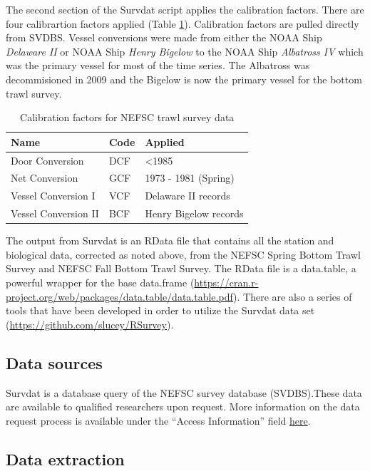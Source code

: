 \documentclass[
]{book}
\begin{document}
The second section of the Survdat script applies the calibration factors. There are four calibrartion
factors applied (Table \ref{tab:calibration}). Calibration factors are pulled directly from SVDBS. Vessel conversions were made from
either the NOAA Ship \emph{Delaware II} or NOAA Ship \emph{Henry Bigelow} to the NOAA Ship \emph{Albatross IV} which was
the primary vessel for most of the time series. The Albatross was decommisioned in 2009 and the Bigelow is
now the primary vessel for the bottom trawl survey.

\begin{table}

\caption{\label{tab:calibration}Calibration factors for NEFSC trawl survey data}
\centering
\begin{tabular}[t]{lll}
\toprule
Name & Code & Applied\\
\midrule
Door Conversion & DCF & <1985\\
Net Conversion & GCF & 1973 - 1981 (Spring)\\
Vessel Conversion I & VCF & Delaware II records\\
Vessel Conversion II & BCF & Henry Bigelow records\\
\bottomrule
\end{tabular}
\end{table}

The output from Survdat is an RData file that contains all the station and biological data, corrected
as noted above, from the NEFSC Spring Bottom Trawl Survey and NEFSC Fall Bottom Trawl Survey. The RData
file is a data.table, a powerful wrapper for the base data.frame (\url{https://cran.r-project.org/web/packages/data.table/data.table.pdf}).
There are also a series of tools that have been developed in order to utilize the Survdat data set
(\url{https://github.com/slucey/RSurvey}).

\hypertarget{data-sources-41}{%
\subsection{Data sources}\label{data-sources-41}}

Survdat is a database query of the NEFSC survey database (SVDBS).These data are available to qualified researchers upon request. More information on the data request process is available under the ``Access Information'' field \href{https://inport.nmfs.noaa.gov/inport/item/22560}{here}.

\hypertarget{data-extraction-32}{%
\subsection{Data extraction}\label{data-extraction-32}}
\end{document}
